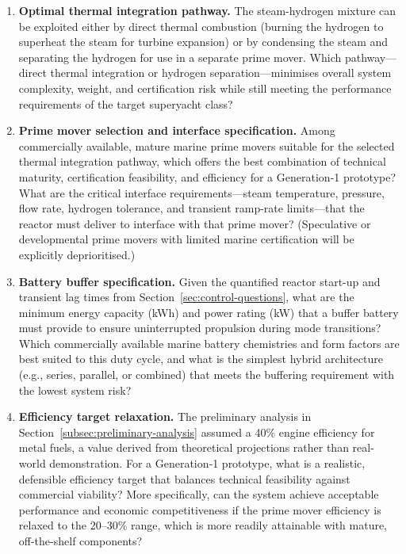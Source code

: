 \documentclass[12pt]{article}
\begin{document}
\begin{enumerate}
    \item \textbf{Optimal thermal integration pathway.} The steam-hydrogen mixture can be exploited either by direct thermal combustion (burning the hydrogen to superheat the steam for turbine expansion) or by condensing the steam and separating the hydrogen for use in a separate prime mover. Which pathway---direct thermal integration or hydrogen separation---minimises overall system complexity, weight, and certification risk while still meeting the performance requirements of the target superyacht class?

    \item \textbf{Prime mover selection and interface specification.} Among commercially available, mature marine prime movers suitable for the selected thermal integration pathway, which offers the best combination of technical maturity, certification feasibility, and efficiency for a Generation‑1 prototype? What are the critical interface requirements---steam temperature, pressure, flow rate, hydrogen tolerance, and transient ramp-rate limits---that the reactor must deliver to interface with that prime mover? (Speculative or developmental prime movers with limited marine certification will be explicitly deprioritised.)

    \item \textbf{Battery buffer specification.} Given the quantified reactor start-up and transient lag times from Section~\ref{sec:control-questions}, what are the minimum energy capacity (kWh) and power rating (kW) that a buffer battery must provide to ensure uninterrupted propulsion during mode transitions? Which commercially available marine battery chemistries and form factors are best suited to this duty cycle, and what is the simplest hybrid architecture (e.g., series, parallel, or combined) that meets the buffering requirement with the lowest system risk?

    \item \textbf{Efficiency target relaxation.} The preliminary analysis in Section~\ref{subsec:preliminary-analysis}
assumed a 40\% engine efficiency for metal fuels, a value derived from theoretical projections rather than real-world demonstration. For a Generation‑1 prototype, what is a realistic, defensible efficiency target that balances technical feasibility against commercial viability? More specifically, can the system achieve acceptable performance and economic competitiveness if the prime mover efficiency is relaxed to the 20--30\% range, which is more readily attainable with mature, off-the-shelf components?
\end{enumerate}
\end{document}
